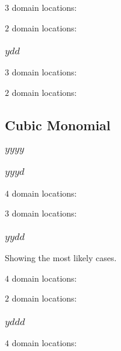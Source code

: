 $3$ domain locations:


$2$ domain locations:


\subsubsection{$ydd$}

$3$ domain locations:


$2$ domain locations:


\subsection{Cubic Monomial}

\subsubsection{$yyyy$}



\subsubsection{$yyyd$}

$4$ domain locations:


$3$ domain locations:


\subsubsection{$yydd$}

Showing the most likely cases.

$4$ domain locations:


$2$ domain locations:


\subsubsection{$yddd$}
$4$ domain locations:



\restoregeometry
  

